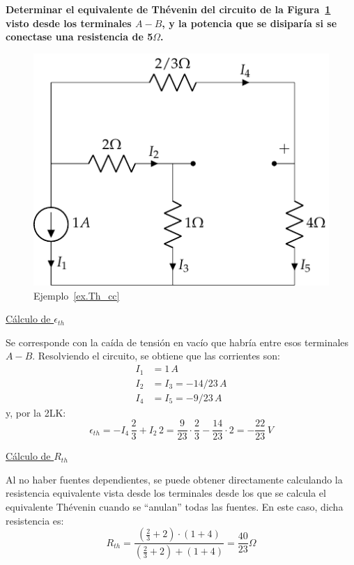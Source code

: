 \documentclass[11pt]{book} %
\begin{document}
\begin{example}\label{ex.Th_cc}
    \textbf{Determinar el equivalente de Thévenin del circuito de la Figura~\ref{fig.ej_Th_cc} visto desde los terminales $A-B$, y la potencia que se disiparía si se conectase una resistencia de 5$\Omega$.}
    \begin{figure}[H]
        \centering
        \includegraphics{../figs/ej_Th_cc1.pdf}
        \caption{Ejemplo~\ref{ex.Th_cc}}
        \label{fig.ej_Th_cc}
    \end{figure}
    
    \underline{Cálculo de $\epsilon_{th}$}
    
    Se corresponde con la caída de tensión en vacío que habría entre esos terminales $A-B$. Resolviendo el circuito, se obtiene que las corrientes son:
    \begin{align*}
        I_1&=1\,A\\
        I_2&=I_3=-14/23\,A\\
        I_4&=I_5=-9/23\,A
    \end{align*}
    y, por la 2LK:
    \begin{equation*}
        \epsilon_{th}=-I_4\,\dfrac{2}{3}+I_2\,2=\dfrac{9}{23}\cdot\dfrac{2}{3}-\dfrac{14}{23}\cdot 2=-\dfrac{22}{23}\,V
    \end{equation*}
    
    \underline{Cálculo de $R_{th}$}
    
    Al no haber fuentes dependientes, se puede obtener directamente calculando la resistencia equivalente vista desde los terminales desde los que se calcula el equivalente Thévenin cuando se ``anulan'' todas las fuentes. En este caso, dicha resistencia es:
    \begin{equation*}
        R_{th}=\dfrac{(\frac{2}{3}+2)\cdot(1+4)}{(\frac{2}{3}+2)+(1+4)}=\dfrac{40}{23}\Omega
    \end{equation*}
    

\end{example}
\end{document}
